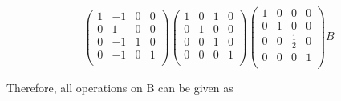 \documentclass[a4paper,12pt]{article}
\begin{document}
 \begin{equation} 
  \begin{pmatrix}
1 & -1 &0 & 0 \\
0 & 1 &0 & 0\\
0 & -1 &1 & 0\\
0 & -1 &0 & 1\\
\end{pmatrix}
 \begin{pmatrix}
1 & 0 &1 & 0 \\
0 & 1 &0 & 0\\
0 & 0 &1 & 0\\
0 & 0 &0 & 1\\
\end{pmatrix}
 \begin{pmatrix}
1 & 0 &0 & 0 \\
0 & 1 &0 & 0\\
0 & 0 &\frac{1}{2} & 0\\
0 & 0 &0 & 1\\
\end{pmatrix}B
 \end{equation}
 
 Therefore, all operations on B can be given as
 
\end{document}
